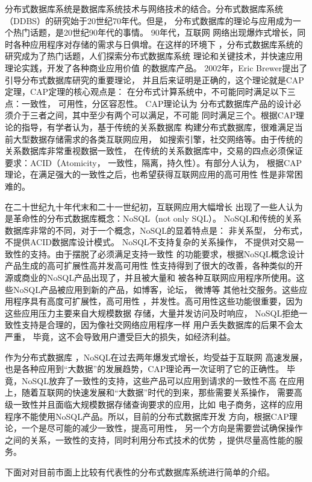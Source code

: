分布式数据库系统是数据库系统技术与网络技术的结合。分布式数据库系统（DDBS）的研究始于20世纪70年代。但是，
分布式数据库的理论与应用成为一个热门话题，是20世纪90年代的事情。
 90年代，互联网
网络出现爆炸式增长，同时各种应用程序对存储的需求与日俱增。在这样的环境下
，分布式数据库系统的研究成为了热门话题，人们探索分布式数据库系统
理论和关键技术，并快速应用理论实践，开发了各种商业应用价值
的数据库产品。 2002年，Eric Brewer提出了引导分布式数据库研究的重要理论，
并且后来证明是正确的，这个理论就是CAP定理，CAP定理的核心观点是：
在分布式计算系统中，不可能同时满足以下三点：一致性，
可用性，分区容忍性。 CAP理论认为
分布式数据库产品的设计必须介于三者之间，其中至少有两个可以满足，不可能
同时满足三个。根据CAP理论的指导，有学者认为，基于传统的关系数据库
构建分布式数据库，很难满足当前大型数据存储需求的各类互联网应用，
如搜索引擎，社交网络等。由于传统的关系数据库非常重视数据一致性，
在传统的关系数据库中，交易的四点必须保证要求：ACID（Atomicity，
一致性，隔离，持久性）。有部分人认为，
根据CAP理论，在满足强大的一致性之后，也希望获得互联网应用的高可用性
性是非常困难的。

在二十世纪九十年代末和二十一世纪初，互联网应用大幅增长
出现了一些人认为是革命性的分布式数据库概念：NoSQL（not only SQL）。
NoSQL和传统的关系数据库非常的不同，对于一个概念，NoSQL的显着特点是：
非关系型，
分布式，不提供ACID数据库设计模式。 NoSQL不支持复杂的关系操作，
不提供对交易一致性的支持。由于摆脱了必须满足支持一致性
的功能要求，根据NoSQL概念设计产品生成的高可扩展性高并发高可用性
性支持得到了很大的改善，各种类似的开源或商业的NoSQL产品出现了，并且被大量和
被各种互联网应用程序所使用。这些NoSQL产品被应用到新的产品，如博客，论坛，
微博等
其他社交服务。这些应用程序具有高度可扩展性，高可用性
，并发性。高可用性这些功能很重要，因为这些应用压力主要来自大规模数据
存储，大量并发访问及时响应，
NoSQL拒绝一致性支持是合理的，因为像社交网络应用程序一样
用户丢失数据库的后果不会太严重，
毕竟，这不会导致用户遭受巨大的损失，如经济利益。


作为分布式数据库
，NoSQL在过去两年爆发式增长，均受益于互联网
高速发展，也是各种应用到“大数据”的发展趋势，CAP理论再一次证明了它的正确性。
毕竟，NoSQL放弃了一致性的支持，这些产品可以应用到请求的一致性不高
在应用上，随着互联网的快速发展和“大数据”时代的到来，那些需要关系操作，
需要高级一致性并且面临大规模数据存储查询要求的应用，比如
电子商务，这样的应用程序不能使用NoSQL产品。所以，目前的分布式数据库开发
方向，根据CAP理论，一个是尽可能的减少一致性，提高可用性，
另一个方向是需要尝试确保操作之间的关系，一致性的支持，同时利用分布式技术的优势
，提供尽量高性能的服务。

下面对对目前市面上比较有代表性的分布式数据库系统进行简单的介绍。

